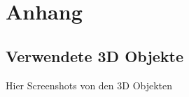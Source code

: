 \chapter{Anhang}\label{app:anhang}
\section{Verwendete 3D Objekte}
Hier Screenshots von den 3D Objekten
